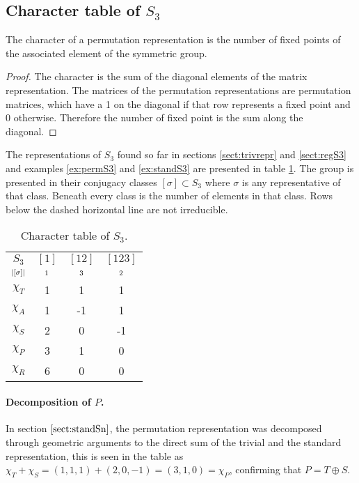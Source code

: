 \subsection{Character table of $S_3$}

\begin{theorem}
	The character of a permutation representation is the number of fixed points of the associated element of the symmetric group.
\end{theorem}
\begin{proof}
	The character is the sum of the diagonal elements of the matrix representation. The matrices of the permutation representations are permutation matrices, which have a 1 on the diagonal if that row represents a fixed point and 0 otherwise. Therefore the number of fixed point is the sum along the diagonal.
\end{proof}

The representations of $S_3$ found so far in sections \ref{sect:trivrepr} and \ref{sect:regS3} and examples \ref{ex:permS3} and \ref{ex:standS3} are presented in table \ref{table:charS3}. The group is presented in their conjugacy classes $[\sigma] \subset S_3$ where $\sigma$ is any representative of that class. Beneath every class is the number of elements in that class. Rows below the dashed horizontal line are not irreducible.

\begin{table}[hbt!]
	\centering
	\begin{tabular}{c | c c c}
		     $S_3$      & $[1]$   & $[12]$  & $[123]$ \\
		$\scriptstyle|[\sigma]|$ & $\scriptstyle 1$ & $\scriptstyle 3$ & $\scriptstyle 2$ \\ \hline
		   $\chi_T$     & 1       & 1       & 1       \\
		   $\chi_A$     & 1       & -1      & 1       \\
		   $\chi_S$     & 2       & 0       & -1      \\ \hdashline
		   $\chi_P$     & 3       & 1       & 0       \\
		   $\chi_R$     & 6       & 0       & 0
	\end{tabular}
	\caption{Character table of $S_3$.}
	\label{table:charS3}
\end{table}

\paragraph{Decomposition of $P$.} In section $\ref{sect:standSn}$, the permutation representation was decomposed through geometric arguments to the direct sum of the trivial and the standard representation, this is seen in the table as $\chi_T + \chi_S = (1,1,1) + (2,0,-1) = (3,1,0) = \chi_P$, confirming that $P = T \oplus S$. 


